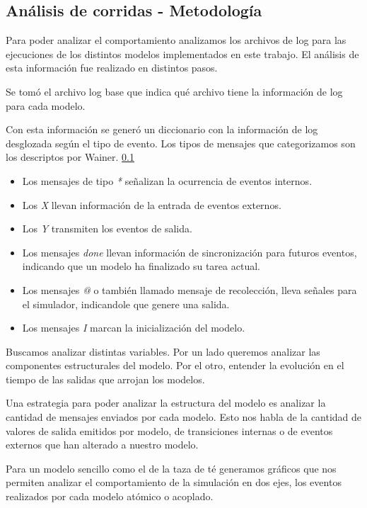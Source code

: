 
\subsection{Análisis de corridas - Metodología}

Para poder analizar el comportamiento analizamos los archivos de log para las ejecuciones de los distintos modelos implementados en este trabajo.
El análisis de esta información fue realizado en distintos pasos.

Se tomó el archivo log base que indica qué archivo tiene la información de log para cada modelo.

Con esta información se generó un diccionario con la información de log desglozada según el tipo de evento. Los tipos de mensajes que categorizamos son los descriptos por Wainer. \ref{}

\begin{itemize}
    \item Los mensajes de tipo \textit{*} señalizan la ocurrencia de eventos internos.
    \item Los \textit{X} llevan información de la entrada de eventos externos.
    \item Los \textit{Y} transmiten los eventos de salida.
    \item Los mensajes \textit{done} llevan información de sincronización para futuros eventos, indicando que un modelo ha finalizado su tarea actual.
    \item Los mensajes  \textit{@} o también llamado mensaje de recolección,
        lleva señales para el simulador, indicandole que genere una salida.
    \item Los mensajes \textit{I} marcan la inicialización del modelo.
\end{itemize}

Buscamos analizar distintas variables. Por un lado queremos analizar las componentes estructurales del modelo. Por el otro, entender la evolución en el tiempo de las salidas que arrojan los modelos.

Una estrategia para poder analizar la estructura del modelo es analizar la
cantidad de mensajes enviados por cada modelo. Esto nos habla de la cantidad de
valores de salida emitidos por modelo, de transiciones internas o de eventos
externos que han alterado a nuestro modelo.

Para un modelo sencillo como el de la taza de té generamos gráficos que nos
permiten analizar el comportamiento de la simulación en dos ejes, los eventos
realizados por cada modelo atómico o acoplado.

